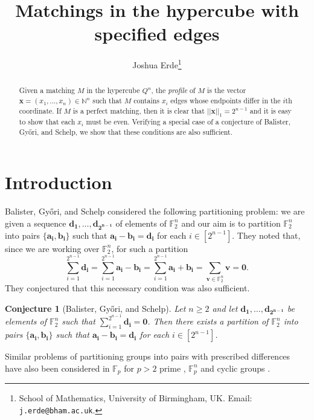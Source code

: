 \documentclass{article}
\title{Matchings in the hypercube with specified edges}
\author{Joshua Erde\thanks{School of Mathematics, University of Birmingham, UK. Email: {\tt j.erde@bham.ac.uk}.}}
\newtheorem{conjecture}[theorem]{Conjecture}
\begin{document}
\maketitle
\begin{abstract}
Given a matching $M$ in the hypercube $Q^n$, the \emph{profile} of $M$ is the vector $\bm{x}=(x_1,\ldots, x_n) \in \mathbb{N}^n$ such that $M$ contains $x_i$ edges whose endpoints differ in the $i$th coordinate. If $M$ is a perfect matching, then it is clear that $||\bm{x}||_1 = 2^{n-1}$ and it is easy to show that each $x_i$ must be even. Verifying a special case of a conjecture of Balister, Gy{\H{o}}ri, and Schelp, we show that these conditions are also sufficient.
\end{abstract}
\section{Introduction}
Balister, Gy{\H{o}}ri, and Schelp \cite{BGS11} considered the following partitioning problem: we are given a sequence $\bm{d_1},\ldots, \bm{d_{2^{n-1}}}$ of elements of $\mathbb{F}_2^n$ and our aim is to partition $\mathbb{F}_2^n$ into pairs $\{\bm{a_i},\bm{b_i}\}$ such that $\bm{a_i} - \bm{b_i} = \bm{d_i}$ for each $i \in \left[2^{n-1}\right]$. They noted that, since we are working over $\mathbb{F}_2^n$, for such a partition
\begin{equation}\label{e:null}
\sum_{i=1}^{2^{n-1}} \bm{d_i} = \sum_{i=1}^{2^{n-1}}  \bm{a_i} - \bm{b_i} =   \sum_{i=1}^{2^{n-1}}  \bm{a_i} + \bm{b_i} = \sum_{\bm{v} \in \mathbb{F}_2^n} \bm{v} = \bm{0}.
\end{equation}
They conjectured that this necessary condition was also sufficient.
\begin{conjecture}[Balister, Gy{\H{o}}ri, and Schelp]\label{c:BGS}
Let $n \geq 2$ and let $\bm{d_1},\ldots, \bm{d_{2^{n-1}}}$ be elements of $\mathbb{F}_2^n$ such that $\sum_{i=1}^{2^{n-1}} \bm{d_i} = \bm{0}$. Then there exists a partition of $\mathbb{F}_2^n$ into pairs $\{\bm{a_i},\bm{b_i}\}$ such that $\bm{a_i} - \bm{b_i} = \bm{d_i}$ for each $i \in \left[2^{n-1}\right]$.
\end{conjecture}
\noindent Similar problems of partitioning groups into pairs with prescribed differences have also been considered in $\mathbb{F}_p$ for $p>2$ prime \cite{KS10,PM09}, $\mathbb{F}_p^n$ \cite{KP12} and cyclic groups \cite{KS16}.
\end{document}
